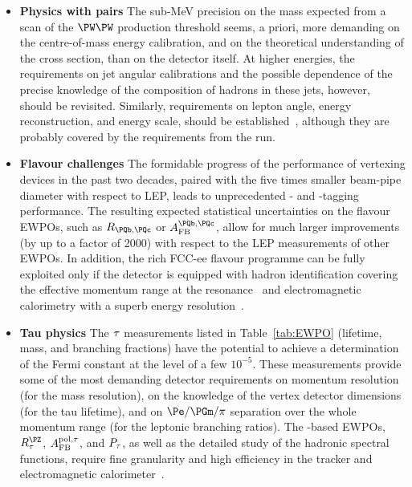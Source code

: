 \begin{itemize}
\item {\bf Physics with \PW pairs} 
The sub-MeV precision on the \PW mass expected from a scan of the $\PW\PW$ production threshold seems, a priori, more demanding on the centre-of-mass energy calibration, and on the theoretical understanding of the cross section, than on the detector itself. 
At higher energies, the requirements on jet angular calibrations and the possible dependence of the precise knowledge of the composition of hadrons in these jets, however, should be revisited. 
Similarly, requirements on lepton angle, energy reconstruction, and energy scale, should be established~\cite{Azzurri:2021yvl}, although they are probably covered by the requirements from the \PZ run.

\item {\bf Flavour challenges}
The formidable progress of the performance of vertexing devices in the past two decades, paired with the five times smaller beam-pipe diameter with respect to LEP, leads to unprecedented \PQb- and \PQc-tagging performance. 
The resulting expected statistical uncertainties on the flavour EWPOs, such as $R_{\PQb,\PQc}$ or $A_\text{FB}^{\PQb,\PQc}$, 
allow for much larger improvements (by up to a factor of 2000) with respect to the LEP measurements of other EWPOs. 
In addition, the rich FCC-ee flavour programme can be fully exploited only if the detector is equipped with hadron identification covering the effective momentum range at the \PZ resonance~\cite{WilkinsonFCCPhys3} and electromagnetic calorimetry with a superb energy resolution~\cite{AleksanFCCPhys4}.

\item {\bf Tau physics}
The $\mathrm{\tau}$ measurements listed in Table~\ref{tab:EWPO} (lifetime, mass, and branching fractions) have the potential to achieve a determination of the Fermi constant at the level of a few $10^{-5}$. 
These measurements provide some of the most demanding detector requirements on momentum resolution (for the mass resolution), on the knowledge of the vertex detector dimensions (for the tau lifetime), and on $\Pe/\PGm/\pi$ separation over the whole momentum range (for the leptonic branching ratios). 
The \Pgt-based EWPOs, $R_{\Pgt}^{\PZ}$, $A_\text{FB}^\text{pol,\ensuremath{\mathrm{\tau}}}$, and $P_{\mathrm{\tau}}$, as well as the detailed study of the hadronic spectral functions, require fine granularity and high efficiency in the tracker and electromagnetic calorimeter~\cite{Dam:2021ibi}.


\end{itemize}
